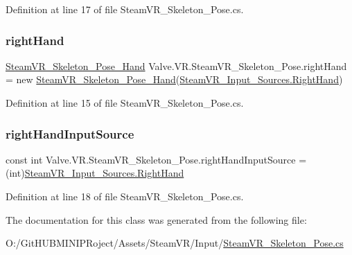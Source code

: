 Definition at line 17 of file Steam\+V\+R\+\_\+\+Skeleton\+\_\+\+Pose.\+cs.

\mbox{\label{class_valve_1_1_v_r_1_1_steam_v_r___skeleton___pose_a8363d4bc4bbc5ea72174b6e60ddec071}} 
\subsubsection{\texorpdfstring{rightHand}{rightHand}}
{\footnotesize\ttfamily \mbox{\hyperlink{class_valve_1_1_v_r_1_1_steam_v_r___skeleton___pose___hand}{Steam\+V\+R\+\_\+\+Skeleton\+\_\+\+Pose\+\_\+\+Hand}} Valve.\+V\+R.\+Steam\+V\+R\+\_\+\+Skeleton\+\_\+\+Pose.\+right\+Hand = new \mbox{\hyperlink{class_valve_1_1_v_r_1_1_steam_v_r___skeleton___pose___hand}{Steam\+V\+R\+\_\+\+Skeleton\+\_\+\+Pose\+\_\+\+Hand}}(\mbox{\hyperlink{namespace_valve_1_1_v_r_a82e5bf501cc3aa155444ee3f0662853faa51983e0f69f76a68e55efe2e7b700b5}{Steam\+V\+R\+\_\+\+Input\+\_\+\+Sources.\+Right\+Hand}})}



Definition at line 15 of file Steam\+V\+R\+\_\+\+Skeleton\+\_\+\+Pose.\+cs.

\mbox{\label{class_valve_1_1_v_r_1_1_steam_v_r___skeleton___pose_a4de49ef44e92db696b5ad38064a0983f}} 
\subsubsection{\texorpdfstring{rightHandInputSource}{rightHandInputSource}}
{\footnotesize\ttfamily const int Valve.\+V\+R.\+Steam\+V\+R\+\_\+\+Skeleton\+\_\+\+Pose.\+right\+Hand\+Input\+Source = (int)\mbox{\hyperlink{namespace_valve_1_1_v_r_a82e5bf501cc3aa155444ee3f0662853faa51983e0f69f76a68e55efe2e7b700b5}{Steam\+V\+R\+\_\+\+Input\+\_\+\+Sources.\+Right\+Hand}}\hspace{0.3cm}{\ttfamily [protected]}}



Definition at line 18 of file Steam\+V\+R\+\_\+\+Skeleton\+\_\+\+Pose.\+cs.



The documentation for this class was generated from the following file\+:\begin{DoxyCompactItemize}
\item 
O\+:/\+Git\+H\+U\+B\+M\+I\+N\+I\+P\+Roject/\+Assets/\+Steam\+V\+R/\+Input/\mbox{\hyperlink{_steam_v_r___skeleton___pose_8cs}{Steam\+V\+R\+\_\+\+Skeleton\+\_\+\+Pose.\+cs}}\end{DoxyCompactItemize}
